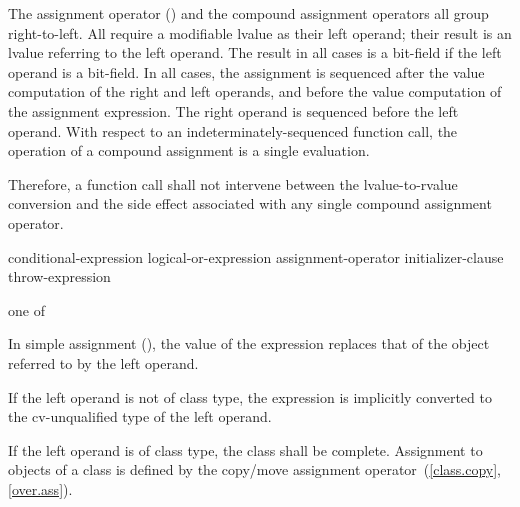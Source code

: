 \pnum
{}%
%
%
%
%
%
%
%
%
%
%
%
The assignment operator (\tcode{=}) and the compound assignment
operators all group right-to-left.
%
All
require a modifiable lvalue as their left operand; their result is an lvalue
referring to the left operand. The result in all cases is a bit-field if
the left operand is a bit-field. In all cases, the assignment is
sequenced after the
%
value computation of the right and left operands,
and before the
value computation of the assignment expression.
The right operand is sequenced before the left operand.
With
respect to an indeterminately-sequenced function call, the operation of
a compound assignment is a single evaluation.
\begin{note}
Therefore, a function call shall not intervene between the
lvalue-to-rvalue conversion and the side effect associated with any
single compound assignment operator.
\end{note}

\begin{bnf}
\br
    conditional-expression\br
    logical-or-expression assignment-operator initializer-clause\br
    throw-expression
\end{bnf}

\begin{bnf}
 \textnormal{one of}\br
    \terminal{=  *=  /=  \%=   +=  -=  >>=  <<=  \&=  \caret=  |=}
\end{bnf}

\pnum
In simple assignment (\tcode{=}), the value of the expression replaces
that of the object referred to by the left operand.

\pnum
{}%
If the left operand is not of class type, the expression is implicitly
converted to the cv-unqualified type of the left
operand.

\pnum
{}%
%
If the left operand is of class type, the class shall be complete.
Assignment to objects of a class is defined by the copy/move assignment
operator~(\ref{class.copy}, \ref{over.ass}).

